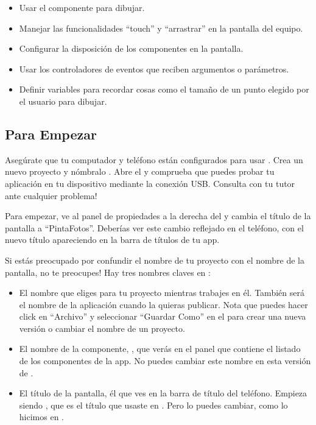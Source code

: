 \begin{itemize}
\item Usar el componente  para dibujar.
\item Manejar las funcionalidades “touch” y “arrastrar” en la pantalla del equipo.
\item Configurar la disposición de los componentes en la pantalla.
\item Usar los controladores de eventos que reciben argumentos o
  parámetros.
\item Definir variables para recordar cosas como el tamaño de un punto
  elegido por el usuario para dibujar.
\end{itemize}

\subsection*{Para Empezar}

Asegúrate que tu computador y teléfono están configurados para usar
\AppInventor. Crea un nuevo proyecto y nómbralo . Abre el
\blockEditor y comprueba que puedes probar tu aplicación en tu
dispositivo mediante la conexión USB. Consulta con tu tutor ante
cualquier problema!

Para empezar, ve al panel de propiedades a la derecha del \designer y
cambia el título de la pantalla a ``PintaFotos''. Deberías ver este
cambio reflejado en el teléfono, con el nuevo título apareciendo en la
barra de títulos de tu app.

Si estás preocupado por confundir el nombre de tu proyecto con el
nombre de la pantalla, no te preocupes! Hay tres nombres claves en
\AppInventor:

\begin{itemize}	

\item El nombre que eliges para tu proyecto mientras trabajes en
  él. También será el nombre de la aplicación cuando la quieras
  publicar. Nota que puedes hacer click en “Archivo” y seleccionar
  ``Guardar Como'' en el \designer para crear una nueva versión o
  cambiar el nombre de un proyecto.

\item El nombre de la componente, , que verás en el
  panel que contiene el listado de los componentes de la app. No
  puedes cambiar este nombre en esta versión de \AppInventor.

\item El título de la pantalla, él que ves en la barra de título del
  teléfono. Empieza siendo , que es el título que
  usaste en . Pero lo puedes cambiar, como lo
  hicimos en .
\end{itemize}

